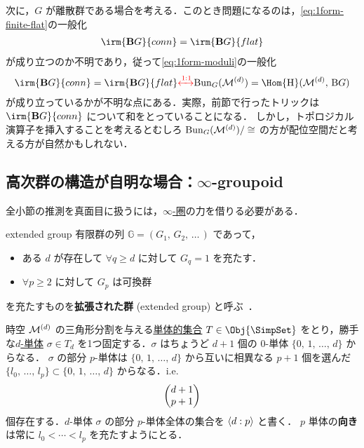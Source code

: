\documentclass[TQFT_main]{subfiles}
\begin{document}
次に，$G$ が離散群である場合を考える．このとき問題になるのは，\eqref{eq:1form-finite-flat}の一般化
\begin{align}
    \irm{\bm{\mathrm{B}}G}{conn} = \irm{\bm{\mathrm{B}}G}{flat} 
\end{align}
が成り立つのか不明であり，従って\eqref{eq:1form-moduli}の一般化
\begin{align}
    \irm{\bm{\mathrm{B}}G}{conn} = \irm{\bm{\mathrm{B}}G}{flat} \textcolor{red}{\xleftrightarrow{1:1}} \mathrm{Bun}_G (\mfdcal{M}{d}) = \Hom{\mathrm{\bm{H}}} (\mfdcal{M}{d},\, \mathrm{\bm{B}}G)
\end{align}
が成り立っているかが不明な点にある．実際，前節で行ったトリックは $\irm{\bm{\mathrm{B}}G}{conn}$ について和をとっていることになる．
しかし，トポロジカル演算子を挿入することを考えるとむしろ $\mathrm{Bun}_G (\mathcal{M}^{(d)})/\cong$ の方が配位空間だと考える方が自然かもしれない．

\subsection{高次群の構造が自明な場合：$\infty$-groupoid}

全小節の推測を真面目に扱うには，\hyperref[def:infinity-1]{$\infty$-圏}の力を借りる必要がある．

\begin{mydef}[label=def:extGrp]{extended group}
    有限群の列 $\mathbb{G} = (G_1,\, G_2,\, \dots \,)$ であって，
    \begin{itemize}
        \item ある $d$ が存在して $\forall q \ge d$ に対して $G_q = 1$ を充たす．
        \item $\forall p \ge 2$ に対して $G_p$ は可換群
    \end{itemize}
    を充たすものを\textbf{拡張された群} (extended group) と呼ぶ~\cite{SChen2024anomaly}．
\end{mydef}

時空 $\mathcal{M}^{(d)}$ の三角形分割を与える\hyperref[def:SimpSet]{単体的集合} $T \in \Obj{\SimpSet}$ をとり，勝手な\hyperref[def:SimpSet]{$d$-単体} $\sigma \in T_d$ を1つ固定する．$\sigma$ はちょうど $d+1$ 個の $0$-単体 $\{0,\, 1,\, \dots,\, d\}$ からなる．
$\sigma$ の部分 $p$-単体は $\{0,\, 1,\, \dots,\, d\}$ から互いに相異なる $p+1$ 個を選んだ $\{l_0,\, \dots,\, l_p\} \subset \{0,\, 1,\, \dots,\, d\}$ からなる．i.e.
\begin{align}
    \mqty(d+1 \\  p+1)
\end{align}
個存在する．$d$-単体 $\sigma$ の部分 $p$-単体全体の集合を $\expval{d:p}$ と書く．
$p$ 単体の\textbf{向き}は常に $l_0 < \cdots < l_p$ を充たすようにとる．
\end{document}
